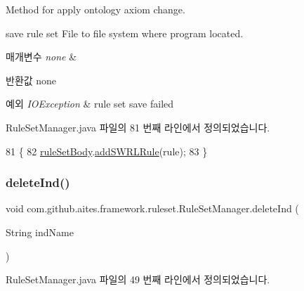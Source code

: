 Method for apply ontology axiom change. 

save rule set File to file system where program located. 
\begin{DoxyParams}{매개변수}
{\em none} & \\
\hline
\end{DoxyParams}
\begin{DoxyReturn}{반환값}
none 
\end{DoxyReturn}

\begin{DoxyExceptions}{예외}
{\em I\+O\+Exception} & rule set save failed \\
\hline
\end{DoxyExceptions}


Rule\+Set\+Manager.\+java 파일의 81 번째 라인에서 정의되었습니다.


\begin{DoxyCode}
81                                              \{      
82         \mbox{\hyperlink{classcom_1_1github_1_1aites_1_1framework_1_1ruleset_1_1_rule_set_manager_a2218521e8abc1048bd369c7ed1c14c60}{ruleSetBody}}.\mbox{\hyperlink{classcom_1_1github_1_1aites_1_1framework_1_1ruleset_1_1_rule_set_body_af7c9f7420cf0b177887893bd6d6f0618}{addSWRLRule}}(rule);
83     \}
\end{DoxyCode}
\mbox{\label{classcom_1_1github_1_1aites_1_1framework_1_1ruleset_1_1_rule_set_manager_ab0ec00173eb4031052115d372aa53f8b}} 
\subsubsection{\texorpdfstring{delete\+Ind()}{deleteInd()}}
{\footnotesize\ttfamily void com.\+github.\+aites.\+framework.\+ruleset.\+Rule\+Set\+Manager.\+delete\+Ind (\begin{DoxyParamCaption}\item[{String}]{ind\+Name }\end{DoxyParamCaption})}



Rule\+Set\+Manager.\+java 파일의 49 번째 라인에서 정의되었습니다.


